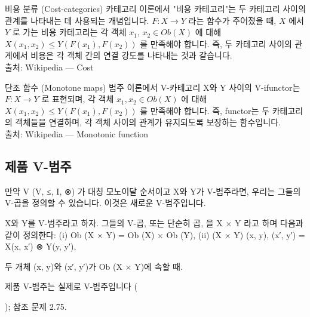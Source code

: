 \documentclass[11pt, a4paper, twoside, openany]{book}
\begin{document}
{\begin{deepresearch}{비용 분류 (Cost-categories)}
카테고리 이론에서 "비용 카테고리"는 두 카테고리 사이의 관계를 나타내는 데 사용되는 개념입니다.  $F: X \rightarrow Y$ 라는 함수가 주어졌을 때, $X$ 에서 $Y$ 로 가는 비용 카테고리는 각 객체 $x_1$, $x_2 \in Ob(X)$ 에 대해 $X(x_1, x_2) \leq Y(F(x_1), F(x_2))$ 를 만족해야 합니다. 즉, 두 카테고리 사이의 관계에서 비용은 각 객체 간의 연결 강도를 나타내는 것과 같습니다.
\\[4pt]{\footnotesize\color{ctgray} 출처: Wikipedia — Cost}
\end{deepresearch}

\begin{deepresearch}{단조 함수 (Monotone maps)}
범주 이론에서 V-카테고리 X\hspace{0pt}와 Y 사이의 V-ifunctor\hspace{0pt}는  $F:X\rightarrow Y$ 로 표현되며, 각 객체 $x_1, x_2 \in Ob(X)$ 에 대해  $X(x_1, x_2) \leq Y(F(x_1), F(x_2))$ 를 만족해야 합니다. 즉, functor\hspace{0pt}는 두 카테고리의 객체들을 연결하며, 각 객체 사이의 관계가 유지되도록 보장하는 함수입니다.
\\[4pt]{\footnotesize\color{ctgray} 출처: Wikipedia — Monotonic function}
\end{deepresearch}


\subsection{제품 V-범주}
\label{sec:2-4-3}

만약 V  (V, ≤, I, ⊗) 가 대칭 모노이달 순서이고 X\hspace{0pt}와 Y\hspace{0pt}가 V-범주라면, 우리는 그들의 V-곱을 정의할 수 있습니다. 이것은 새로운 V-범주입니다.

\par\medskip
\begin{definitionbox}[정의 2.74.]
X\hspace{0pt}와 Y\hspace{0pt}를 V-범주라고 하자. 그들의 V-곱, 또는 단순히 곱, 을  X × Y 라고 하며 다음과 같이 정의한다:
(i) Ob (X × Y) = Ob (X) × Ob (Y),
(ii) (X × Y) 
(x, y), (x′, y′)   = X(x, x′) ⊗ Y(y, y′),
\end{definitionbox}

\par\medskip
두 개체 (x, y)와 (x′, y′)가 Ob (X × Y)에 속할 때.

\par\medskip
제품 V-범주는 실제로 V-범주입니다 (
\begin{definitionbox}[정의 2.46]
); 참조 문제 2.75.
\end{definitionbox}

}
\end{document}
